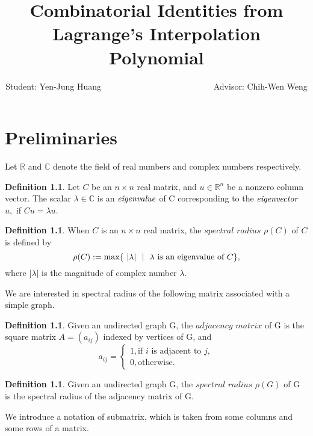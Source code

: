 \documentclass[12pt]{report}%
\title{Combinatorial Identities from Lagrange's Interpolation Polynomial}
\author{Student: Yen-Jung Huang  ~~~~~~~~~~~~~~~~~~~~~~~~~~Advisor: Chih-Wen Weng}
\date{} %
\theoremstyle{plain}
\theoremstyle{definition}
\newtheorem{defn}[thm]{Definition}
\begin{document}
\chapter{Preliminaries}

Let $\mathbb{R}$ and $\mathbb{C}$ denote the
 field of real numbers and complex numbers respectively.


\begin{defn}
    Let $C$ be an $n \times n$ real matrix, and $u \in \mathbb{R}^n$ be a
     nonzero column vector. The scalar $\lambda \in \mathbb{C}$ is an $\it{eigenvalue}$
      of C corresponding to the $\it{eigenvector}$ $u,$  if $Cu = \lambda u.$
   
\end{defn}

\begin{defn}

When $C$ is an $n \times n$ real matrix, the $\textit {spectral radius} $ $\rho(C)$ of $C$
 is defined by 
 $$\rho(C):=\max\{~|\lambda|~\ |~~\lambda\hbox{ is an eigenvalue of $C$}\},$$
where $|\lambda|$ is the magnitude of complex number $\lambda.$
\end{defn}

We are interested in spectral radius of the following matrix associated with a simple graph.

\begin{defn}
    Given an undirected graph G, the$\textit{ adjacency matrix}$ of G is the square
     matrix $A = (a_{ij})$ indexed by vertices of G, and
      \[a_{ij} =\begin{cases}
    1, \text{if $i$ is adjacent to $j$}, \\
    0, \text{otherwise.}
                \end{cases}
    \]
\end{defn}

\begin{defn}
Given an undirected graph G, the $\textit{spectral radius}$  $\rho(G) $ of G is the spectral
 radius of the adjacency matrix of G.
\end{defn}

    We introduce a notation of submatrix, which is taken from some columns and some rows of a
     matrix.
\end{document}
